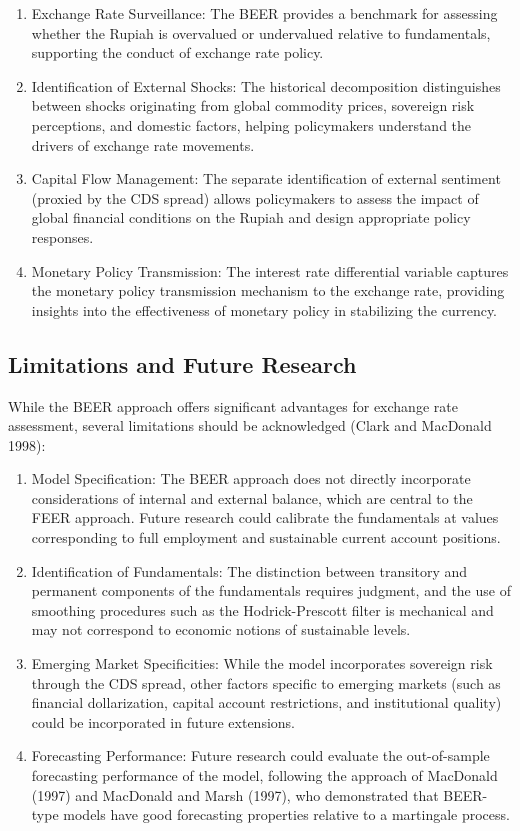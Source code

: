 \documentclass[
  manuscript=article,
  layout=publish,
  year=2026,
  volume=6,
]{den}
\begin{document}
\begin{enumerate}
\def\labelenumi{\arabic{enumi}.}
\item
  Exchange Rate Surveillance: The BEER provides a benchmark for
  assessing whether the Rupiah is overvalued or undervalued relative to
  fundamentals, supporting the conduct of exchange rate policy.
\item
  Identification of External Shocks: The historical decomposition
  distinguishes between shocks originating from global commodity prices,
  sovereign risk perceptions, and domestic factors, helping policymakers
  understand the drivers of exchange rate movements.
\item
  Capital Flow Management: The separate identification of external
  sentiment (proxied by the CDS spread) allows policymakers to assess
  the impact of global financial conditions on the Rupiah and design
  appropriate policy responses.
\item
  Monetary Policy Transmission: The interest rate differential variable
  captures the monetary policy transmission mechanism to the exchange
  rate, providing insights into the effectiveness of monetary policy in
  stabilizing the currency.
\end{enumerate}

\subsection{Limitations and Future
Research}\label{limitations-and-future-research}

While the BEER approach offers significant advantages for exchange rate
assessment, several limitations should be acknowledged (Clark and
MacDonald 1998):

\begin{enumerate}
\def\labelenumi{\arabic{enumi}.}
\item
  Model Specification: The BEER approach does not directly incorporate
  considerations of internal and external balance, which are central to
  the FEER approach. Future research could calibrate the fundamentals at
  values corresponding to full employment and sustainable current
  account positions.
\item
  Identification of Fundamentals: The distinction between transitory and
  permanent components of the fundamentals requires judgment, and the
  use of smoothing procedures such as the Hodrick-Prescott filter is
  mechanical and may not correspond to economic notions of sustainable
  levels.
\item
  Emerging Market Specificities: While the model incorporates sovereign
  risk through the CDS spread, other factors specific to emerging
  markets (such as financial dollarization, capital account
  restrictions, and institutional quality) could be incorporated in
  future extensions.
\item
  Forecasting Performance: Future research could evaluate the
  out-of-sample forecasting performance of the model, following the
  approach of MacDonald (1997) and MacDonald and Marsh (1997), who
  demonstrated that BEER-type models have good forecasting properties
  relative to a martingale process.
\end{enumerate}
\end{document}
